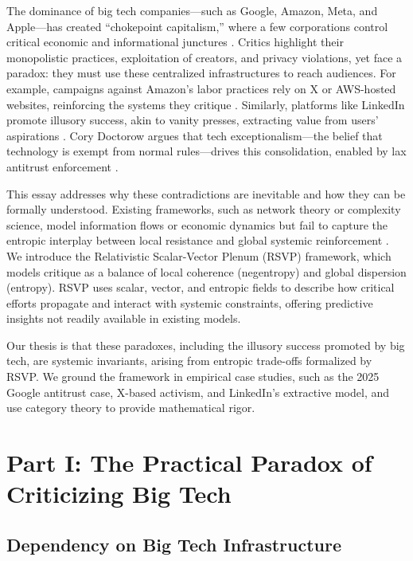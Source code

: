 \documentclass{article}
\begin{document}
The dominance of big tech companies—such as Google, Amazon, Meta, and Apple—has created ``chokepoint capitalism,'' where a few corporations control critical economic and informational junctures \cite{giblin2022chokepoint}. Critics highlight their monopolistic practices, exploitation of creators, and privacy violations, yet face a paradox: they must use these centralized infrastructures to reach audiences. For example, campaigns against Amazon's labor practices rely on X or AWS-hosted websites, reinforcing the systems they critique \cite{doctorow2023internetcon}. Similarly, platforms like LinkedIn promote illusory success, akin to vanity presses, extracting value from users’ aspirations \cite{theculturejournalist2023,amos2024}. Cory Doctorow argues that tech exceptionalism—the belief that technology is exempt from normal rules—drives this consolidation, enabled by lax antitrust enforcement \cite{doctorow2023internetcon}.

This essay addresses why these contradictions are inevitable and how they can be formally understood. Existing frameworks, such as network theory or complexity science, model information flows or economic dynamics but fail to capture the entropic interplay between local resistance and global systemic reinforcement \cite{barabasi2002linked}. We introduce the Relativistic Scalar-Vector Plenum (RSVP) framework, which models critique as a balance of local coherence (negentropy) and global dispersion (entropy). RSVP uses scalar, vector, and entropic fields to describe how critical efforts propagate and interact with systemic constraints, offering predictive insights not readily available in existing models.

Our thesis is that these paradoxes, including the illusory success promoted by big tech, are systemic invariants, arising from entropic trade-offs formalized by RSVP. We ground the framework in empirical case studies, such as the 2025 Google antitrust case, X-based activism, and LinkedIn’s extractive model, and use category theory to provide mathematical rigor.

\section{Part I: The Practical Paradox of Criticizing Big Tech}

\subsection{Dependency on Big Tech Infrastructure}
\end{document}
